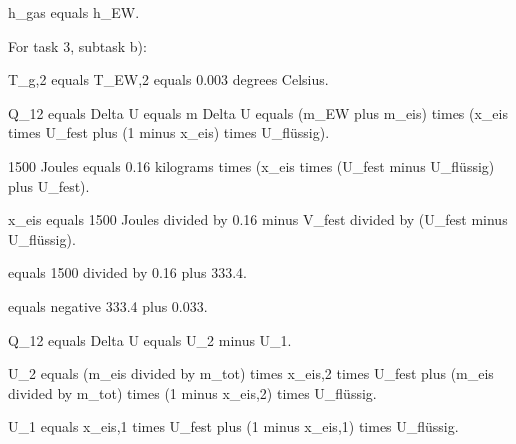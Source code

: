 h_gas equals h_EW.

For task 3, subtask b):

T_g,2 equals T_EW,2 equals 0.003 degrees Celsius.

Q_12 equals Delta U equals m Delta U equals (m_EW plus m_eis) times (x_eis times U_fest plus (1 minus x_eis) times U_flüssig).

1500 Joules equals 0.16 kilograms times (x_eis times (U_fest minus U_flüssig) plus U_fest).

x_eis equals 1500 Joules divided by 0.16 minus V_fest divided by (U_fest minus U_flüssig).

equals 1500 divided by 0.16 plus 333.4.

equals negative 333.4 plus 0.033.

Q_12 equals Delta U equals U_2 minus U_1.

U_2 equals (m_eis divided by m_tot) times x_eis,2 times U_fest plus (m_eis divided by m_tot) times (1 minus x_eis,2) times U_flüssig.

U_1 equals x_eis,1 times U_fest plus (1 minus x_eis,1) times U_flüssig.